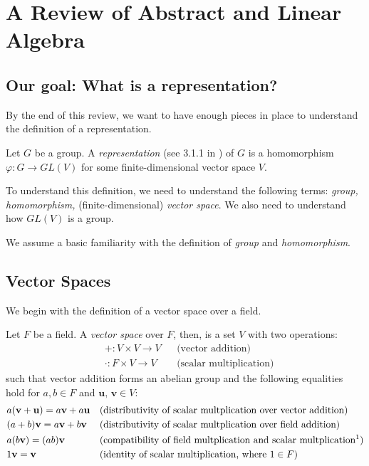 \section{A Review of Abstract and Linear Algebra}

\subsection{Our goal: What is a representation?}
By the end of this review, we want to have enough pieces in place to understand
the definition of a representation.

\begin{defn}
  Let $G$ be a group. A \textit{representation} (see 3.1.1 in \cite{steinberg})
  of $G$ is a homomorphism $\varphi : G \to GL(V)$ for some finite-dimensional
  vector space $V$.
\end{defn}

To understand this definition, we need to understand the following terms:
\textit{group, homomorphism,} (finite-dimensional) \textit{vector space}. We
also need to understand how $GL(V)$ is a group.

We assume a basic familiarity with the definition of \textit{group} and
\textit{homomorphism}.

\subsection{Vector Spaces}

We begin with the definition of a vector space over a field.

\begin{defn}
  Let $F$ be a field. A \textit{vector space} over $F$, then, is a set $V$ with
  two operations:
  \begin{align*}
    &+ : V \times V \to V && \text{(vector addition)}\\
    &\cdot : F \times V \to V && \text{(scalar multiplication)}
  \end{align*}
  such that vector addition forms an abelian group and the following equalities
  hold for $a, b \in F$ and $\textbf{u, v} \in V$:
  \begin{align*}
    &a(\textbf{v}+\textbf{u}) = a\textbf{v} + a\textbf{u} &&
    \text{(distributivity of scalar multplication over vector addition)}\\
    &(a+b)\textbf{v} = a\textbf{v} + b\textbf{v} && \text{(distributivity of
      scalar multplication over field addition)}\\
    &a(b\textbf{v}) = (ab)\textbf{v} && \text{(compatibility of field
      multplication and scalar multplication\footnotemark)}\\
    &1\textbf{v} = \textbf{v} && \text{(identity of scalar multiplication, where
      $1 \in F$)}
  \end{align*}
\end{defn}

